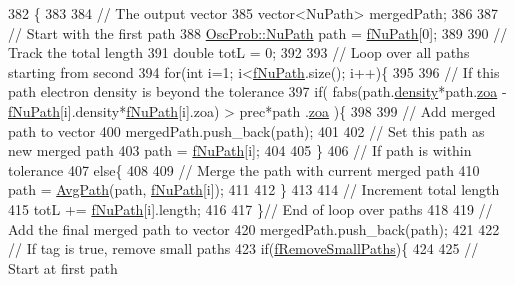 \begin{DoxyCode}
382                                                    \{
383 
384   \textcolor{comment}{// The output vector}
385   vector<NuPath> mergedPath;
386 
387   \textcolor{comment}{// Start with the first path}
388   \hyperlink{structOscProb_1_1NuPath}{OscProb::NuPath} path = \hyperlink{classOscProb_1_1PremModel_afb5674b8b06add6b981e557d7b07016c}{fNuPath}[0];
389 
390   \textcolor{comment}{// Track the total length}
391   \textcolor{keywordtype}{double} totL = 0;
392 
393   \textcolor{comment}{// Loop over all paths starting from second}
394   \textcolor{keywordflow}{for}(\textcolor{keywordtype}{int} i=1; i<\hyperlink{classOscProb_1_1PremModel_afb5674b8b06add6b981e557d7b07016c}{fNuPath}.size(); i++)\{
395 
396     \textcolor{comment}{// If this path electron density is beyond the tolerance}
397     \textcolor{keywordflow}{if}( fabs(path.\hyperlink{structOscProb_1_1NuPath_a54ddd451db69bc54434de3cf18a117ca}{density}*path.\hyperlink{structOscProb_1_1NuPath_af3213f3691ba83c6bc05f4a3490f6b31}{zoa} - \hyperlink{classOscProb_1_1PremModel_afb5674b8b06add6b981e557d7b07016c}{fNuPath}[i].density*\hyperlink{classOscProb_1_1PremModel_afb5674b8b06add6b981e557d7b07016c}{fNuPath}[i].zoa) > prec*path
      .\hyperlink{structOscProb_1_1NuPath_af3213f3691ba83c6bc05f4a3490f6b31}{zoa} )\{
398 
399       \textcolor{comment}{// Add merged path to vector}
400       mergedPath.push\_back(path);
401       
402       \textcolor{comment}{// Set this path as new merged path}
403       path = \hyperlink{classOscProb_1_1PremModel_afb5674b8b06add6b981e557d7b07016c}{fNuPath}[i];
404 
405     \}
406     \textcolor{comment}{// If path is within tolerance}
407     \textcolor{keywordflow}{else}\{
408       
409       \textcolor{comment}{// Merge the path with current merged path}
410       path = \hyperlink{classOscProb_1_1PremModel_a646977424cdca178a77694397146c2f8}{AvgPath}(path, \hyperlink{classOscProb_1_1PremModel_afb5674b8b06add6b981e557d7b07016c}{fNuPath}[i]);
411 
412     \}
413 
414     \textcolor{comment}{// Increment total length}
415     totL += \hyperlink{classOscProb_1_1PremModel_afb5674b8b06add6b981e557d7b07016c}{fNuPath}[i].length;
416 
417   \}\textcolor{comment}{// End of loop over paths}
418 
419   \textcolor{comment}{// Add the final merged path to vector}
420   mergedPath.push\_back(path);
421 
422   \textcolor{comment}{// If tag is true, remove small paths}
423   \textcolor{keywordflow}{if}(\hyperlink{classOscProb_1_1PremModel_a3973df6f5f2ff219cd2f865b31aacfd2}{fRemoveSmallPaths})\{
424 
425     \textcolor{comment}{// Start at first path}

\end{DoxyCode}
